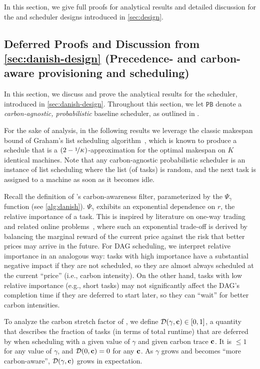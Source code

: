 In this section, we give full proofs for analytical results and detailed discussion for the \DANISH and \CAP scheduler designs introduced in \autoref{sec:design}.

\subsection{Deferred Proofs and Discussion from \autoref{sec:danish-design} (Precedence- and carbon-aware provisioning and scheduling)} \label{apx:danish-proofs}

In this section, we discuss and prove the analytical results for the \DANISH scheduler, introduced in \autoref{sec:danish-design}.  Throughout this section, we let $\texttt{PB}$ denote a \textit{carbon-agnostic, probabilistic} baseline scheduler, as outlined in .

For the sake of analysis, in the following results we leverage the classic makespan bound of Graham's list scheduling algorithm~\cite{Graham:66}, which is known to produce a schedule that is a $(2 - \nicefrac{1}{K})$-approximation for the optimal makespan on $K$ identical machines.  
Note that any carbon-agnostic probabilistic scheduler is an instance of list scheduling where the list (of tasks) is random, and the next task is assigned to a machine as soon as it becomes idle.


Recall the definition of \DANISH's carbon-awareness filter, parameterized by the $\Psi_\gamma$ function (see \autoref{alg:danish}). $\Psi_\gamma$ exhibits an exponential dependence on $r$, the relative importance of a task.  This is inspired by literature on one-way trading and related online problems~\cite{ElYaniv:01, Zhou:08}, where such an exponential trade-off is derived by balancing the marginal reward of the current price against the risk that better prices may arrive in the future.  
For DAG scheduling, we interpret relative importance in an analogous way: tasks with high importance have a substantial negative impact if they are not scheduled, so they are almost always scheduled at the current ``price'' (i.e., carbon intensity).  On the other hand, tasks with low relative importance (e.g., short tasks) may not significantly affect the DAG's completion time if they are deferred to start later, so they can ``wait'' for better carbon intensities.

To analyze the carbon stretch factor of \DANISH, we define $\mathcal{D}(\gamma, {\mathbf{c}}) \in [0,1]$, a quantity that describes the fraction of tasks (in terms of total runtime) that are deferred by \DANISH when scheduling with a given value of $\gamma$ and given carbon trace ${\mathbf{c}}$.  It is $\leq 1$ for any value of $\gamma$, and $\mathcal{D}(0, {\mathbf{c}}) = 0$ for any ${\mathbf{c}}$.  As $\gamma$ grows and \DANISH becomes ``more carbon-aware'',  $\mathcal{D}(\gamma, {\mathbf{c}})$ grows in expectation.%

